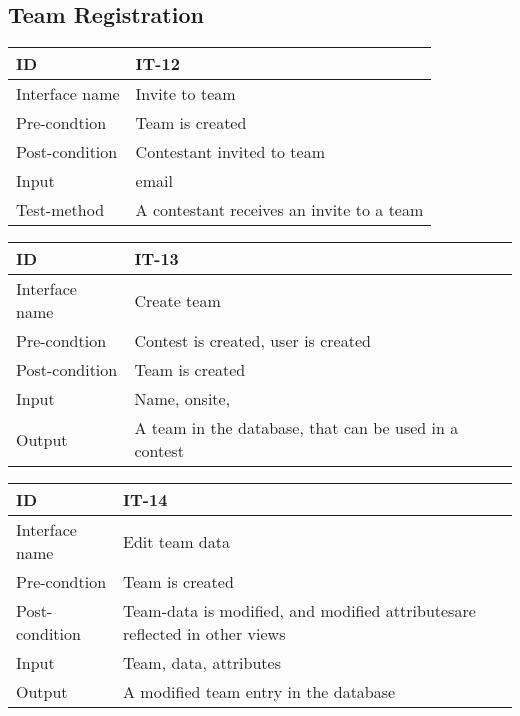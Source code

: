 \subsection{Team Registration}
\begin{center}
\begin{tabular}{|l|p{}|}
\hline
ID & IT-12\\\hline
Interface name & Invite to team\\\hline
Pre-condtion & Team is created\\\hline
Post-condition & Contestant invited to team\\\hline
Input & email\\\hline
Test-method & A contestant receives an invite to a team\\\hline
\end{tabular}
\end{center}

\begin{center}
\begin{tabular}{|l|p{}|}
\hline
ID & IT-13\\\hline
Interface name & Create team\\\hline
Pre-condtion & Contest is created, user is created\\\hline
Post-condition & Team is created\\\hline
Input & Name, onsite,\\\hline
Output & A team in the database, that can be used in a
contest\\\hline
\end{tabular}
\end{center}

\begin{center}
\begin{tabular}{|l|p{}|}
\hline
ID & IT-14\\\hline
Interface name & Edit team data\\\hline
Pre-condtion & Team is created\\\hline
Post-condition & Team-data is modified, and modified attributesare reflected in
other views\\\hline
Input & Team, data, attributes\\\hline
Output & A modified team entry in the database\\\hline
\end{tabular}
\end{center}
